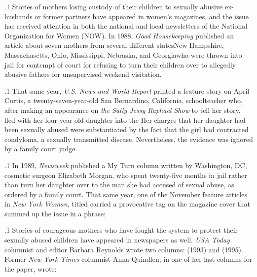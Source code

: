 \documentclass[11pt, twoside]{article}
\begin{document}
{\p.1{%
Stories of mothers losing custody of their children to sexually abusive
ex-husbands or former partners have appeared in women’s magazines,
and the issue has received attention in both the national and local
newsletters of the National Organization for Women (NOW). In 1988,
\textit{Good Housekeeping} published an article about seven mothers from
several different states\mdash{}New Hampshire, Massachusetts, Ohio, Mississippi, Nebraska, and Georgia\mdash{}who were thrown into jail for contempt
of court for refusing to turn their children over to allegedly abusive
fathers for unsupervised weekend visitation.
}%

\p.1{%
That same year, \textit{U.S. News and World Report} printed a feature story
on April Curtis, a twenty-seven-year-old San Bernardino, California, schoolteacher who, after making an appearance on \textit{the Sally Jessy
Raph\-ael Show} to tell her story, fled with her four-year-old daughter
into the  Her charges that her daughter had
been sexually abused were substantiated by the fact that the girl had
contracted condyloma, a sexually transmitted disease. Nevertheless, the
evidence was ignored by a family court judge.
}%

\p.1{%
In 1989, \textit{Newsweek} published a My Turn column written by Washington, DC, cosmetic surgeon Elizabeth Morgan, who spent twenty-five
months in jail rather than turn her daughter over to the man
she had accused of sexual abuse, as ordered by a family court. That
same year, one of the November feature articles in \textit{New York Woman},
titled  carried a provocative tag on the magazine cover that summed up the issue in a phrase: 
}%

\p.1{%
Stories of courageous mothers who have fought the system to protect their sexually abused children have appeared in newspapers as well.
\textit{USA Today} columnist and editor Barbara Reynolds wrote two columns:
 (1993) and  (1995). Former \textit{New York Times} columnist
Anna Quindlen, in one of her last columns for the paper, wrote: 
}%

}
\end{document}
